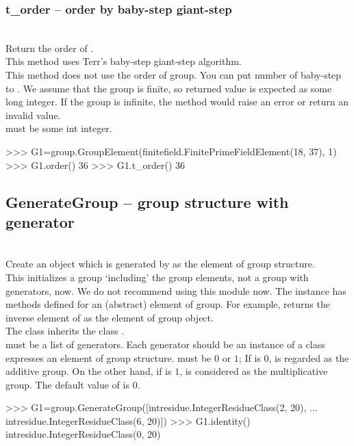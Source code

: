   \subsubsection{t\_order -- order by baby-step giant-step}
   \\
   \spacing
   \quad Return the order of .\\
   \spacing
   \quad \negok This method uses Terr's baby-step giant-step algorithm.\\
   This method does not use the order of group.
   You can put number of baby-step to .
   \negok We assume that the group is finite, so returned value is expected as some long integer.
   \negok If the group is infinite, the method would raise an error or return an invalid value.\\
   \spacing
   \quad {} must be some int integer.\\
\begin{ex}
>>> G1=group.GroupElement(finitefield.FinitePrimeFieldElement(18, 37), 1)
>>> G1.order()
36
>>> G1.t_order()
36
\end{ex}%
\C

 \subsection{\negok GenerateGroup -- group structure with generator}
 \initialize
  \\
  \spacing
  \quad Create an object which is generated by  as the element of group structure. \\
  \spacing
  \quad This initializes a group `including' the group elements, not a group with generators, now.
  We do not recommend using this module now.
  The instance has methods defined for an (abstract) element of group.
  For example,  returns the inverse element of  as the element of group object.\\
  The class inherits the class .\\
  \spacing
  \quad {} must be a list of generators.
  Each generator should be an instance of a class expresses an element of group structure.
   must be $0$ or $1$;
  If  is $0$,  is regarded as the additive group.
  On the other hand, if  is $1$,  is considered as the multiplicative group.
  The default value of  is $0$.\\
\begin{ex}
>>> G1=group.GenerateGroup([intresidue.IntegerResidueClass(2, 20),
... intresidue.IntegerResidueClass(6, 20)])
>>> G1.identity()
intresidue.IntegerResidueClass(0, 20)
\end{ex}%
\C

